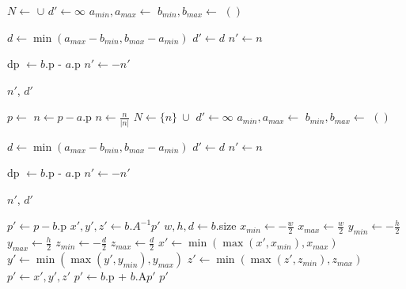 \documentclass{article}
\begin{document}
\begin{algorithmic}
        \State $N \gets$  $\cup$ 
        \State $d' \gets \infty$
            \State $a_{min}, a_{max} \gets$ 
            \State $b_{min}, b_{max} \gets$ 
                \State \Return $()$
            \EndIf

            \State $d \gets \min(a_{max} - b_{min}, b_{max} - a_{min})$
                \State $d' \gets d$
                \State $n' \gets n$
            \EndIf
        \EndFor

        \State dp $\gets b$.p - $a$.p
            \State $n' \gets -n'$
        \EndIf

        \State \Return $n'$, $d'$
    \EndFunction
\end{algorithmic}

\newpage

\begin{algorithmic}
        \State $p \gets$ 
        \State $n \gets p - a$.p
        \State $n \gets \frac{n}{|n|}$
        \State $N \gets \{n\}~\cup$ 
        \State $d' \gets \infty$
            \State $a_{min}, a_{max} \gets$ 
            \State $b_{min}, b_{max} \gets$ 
                \State \Return $()$
            \EndIf

            \State $d \gets \min(a_{max} - b_{min}, b_{max} - a_{min})$
                \State $d' \gets d$
                \State $n' \gets n$
            \EndIf
        \EndFor

        \State dp $\gets b$.p - $a$.p
            \State $n' \gets -n'$
        \EndIf

        \State \Return $n'$, $d'$
    \EndFunction
\end{algorithmic}

\newpage

\begin{algorithmic}
        \State $p' \gets p - b$.p
        \State $x', y', z' \gets b$.$A^{-1} p'$
        \State $w, h, d \gets b$.size
        \State $x_{min} \gets -\frac{w}{2}$
        \State $x_{max} \gets \frac{w}{2}$
        \State $y_{min} \gets -\frac{h}{2}$
        \State $y_{max} \gets \frac{h}{2}$
        \State $z_{min} \gets -\frac{d}{2}$
        \State $z_{max} \gets \frac{d}{2}$
        \State $x' \gets \min(\max(x', x_{min}), x_{max})$
        \State $y' \gets \min(\max(y', y_{min}), y_{max})$
        \State $z' \gets \min(\max(z', z_{min}), z_{max})$
        \State $p' \gets x', y', z'$
        \State $p' \gets b$.p + $b$.A$p'$
        \State \Return $p'$
    \EndFunction
\end{algorithmic}
\end{document}
